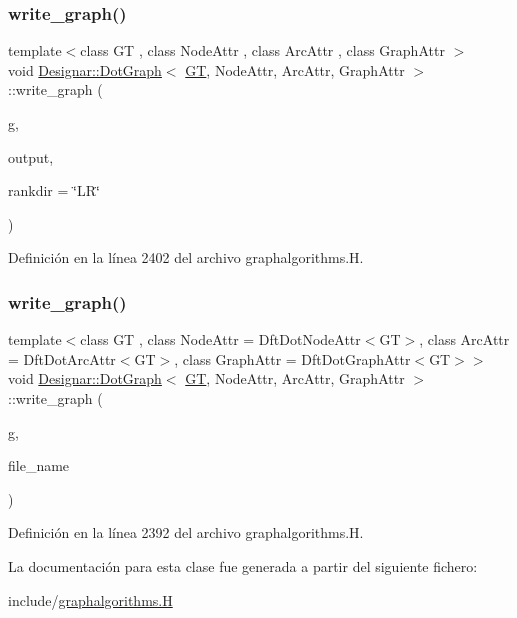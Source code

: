 \subsubsection{\texorpdfstring{write\+\_\+graph()}{write\_graph()}\hspace{0.1cm}{\footnotesize\ttfamily [1/2]}}
{\footnotesize\ttfamily template$<$class GT , class Node\+Attr , class Arc\+Attr , class Graph\+Attr $>$ \\
void \hyperlink{class_designar_1_1_dot_graph}{Designar\+::\+Dot\+Graph}$<$ \hyperlink{demo-buildgraph_8_c_a3001c40d2c31ca87ed96cd7d1334a55e}{GT}, Node\+Attr, Arc\+Attr, Graph\+Attr $>$\+::write\+\_\+graph (\begin{DoxyParamCaption}\item[{const \hyperlink{demo-buildgraph_8_c_a3001c40d2c31ca87ed96cd7d1334a55e}{GT} \&}]{g,  }\item[{std\+::ofstream \&}]{output,  }\item[{const std\+::string \&}]{rankdir = {\ttfamily \char`\"{}LR\char`\"{}} }\end{DoxyParamCaption})}



Definición en la línea 2402 del archivo graphalgorithms.\+H.

\mbox{\label{class_designar_1_1_dot_graph_a6f2b98b76d2c970ad875a59388f693cb}} 
\subsubsection{\texorpdfstring{write\+\_\+graph()}{write\_graph()}\hspace{0.1cm}{\footnotesize\ttfamily [2/2]}}
{\footnotesize\ttfamily template$<$class GT , class Node\+Attr  = Dft\+Dot\+Node\+Attr$<$\+G\+T$>$, class Arc\+Attr  = Dft\+Dot\+Arc\+Attr$<$\+G\+T$>$, class Graph\+Attr  = Dft\+Dot\+Graph\+Attr$<$\+G\+T$>$$>$ \\
void \hyperlink{class_designar_1_1_dot_graph}{Designar\+::\+Dot\+Graph}$<$ \hyperlink{demo-buildgraph_8_c_a3001c40d2c31ca87ed96cd7d1334a55e}{GT}, Node\+Attr, Arc\+Attr, Graph\+Attr $>$\+::write\+\_\+graph (\begin{DoxyParamCaption}\item[{const \hyperlink{demo-buildgraph_8_c_a3001c40d2c31ca87ed96cd7d1334a55e}{GT} \&}]{g,  }\item[{const std\+::string \&}]{file\+\_\+name }\end{DoxyParamCaption})\hspace{0.3cm}{\ttfamily [inline]}}



Definición en la línea 2392 del archivo graphalgorithms.\+H.



La documentación para esta clase fue generada a partir del siguiente fichero\+:\begin{DoxyCompactItemize}
\item 
include/\hyperlink{graphalgorithms_8_h}{graphalgorithms.\+H}\end{DoxyCompactItemize}
